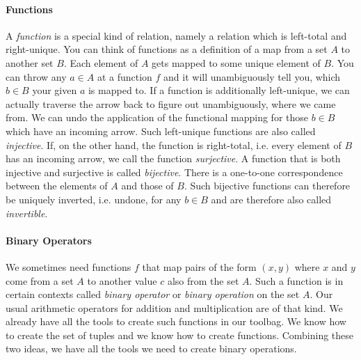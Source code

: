 \paragraph{Functions} A \emph{function} is a special kind of relation, namely a relation which is left-total and right-unique. You can think of functions as a definition of a map from a set $A$ to another set $B$. Each element of $A$ gets mapped to some unique element of $B$. You can throw any $a \in A$ at a function $f$ and it will unambiguously tell you, which $b \in B$ your given $a$ is mapped to. If a function is additionally left-unique, we can actually traverse the arrow back to figure out unambiguously, where we came from. We can undo the application of the functional mapping for those $b \in B$ which have an incoming arrow. Such left-unique functions are also called \emph{injective}. If, on the other hand, the function is right-total, i.e. every element of $B$ has an incoming arrow, we call the function \emph{surjective}. A function that is both injective and surjective is called \emph{bijective}. There is a one-to-one correspondence between the elements of $A$ and those of $B$. Such bijective functions can therefore be uniquely inverted, i.e. undone, for any $b \in B$ and are therefore also called \emph{invertible}.


\paragraph{Binary Operators} We sometimes need functions $f$ that map pairs of the form $(x,y)$ where $x$ and $y$ come from a set $A$ to another value $c$ also from the set $A$. Such a function is in certain contexts called \emph{binary operator} or \emph{binary operation} on the set $A$. Our usual arithmetic operators for addition and multiplication are of that kind. We already have all the tools to create such functions in our toolbag. We know how to create the set of tuples and we know how to create functions. Combining these two ideas, we have all the tools we need to create binary operations.


